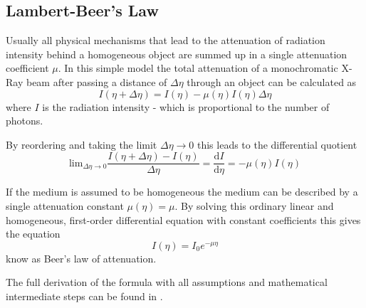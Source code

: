 \subsection{Lambert-Beer's Law\cite{buzug}}
\par Usually all physical mechanisms that lead to the attenuation of radiation intensity behind a homogeneous object are summed up in a single attenuation coefficient \(\mu\). In this simple model the total attenuation of a monochromatic X-Ray beam after passing a distance of \(\Delta\eta\) through an object can be calculated as \[I(\eta + \Delta\eta) = I(\eta) - \mu(\eta)I(\eta)\Delta\eta \] where \(I\) is the radiation intensity - which is proportional to the number of photons.
\par By reordering and taking the limit \(\Delta\eta \rightarrow 0\) this leads to the differential quotient\[\textrm{lim}_{\Delta\eta\rightarrow 0} \frac{I(\eta + \Delta\eta) - I(\eta)}{\Delta\eta} = \frac{\textrm{d}I}{\textrm{d}\eta} = -\mu(\eta)I(\eta)\]
\par If the medium is assumed to be homogeneous the medium can be described by a single attenuation constant \(\mu(\eta) = \mu\). By solving this ordinary linear and homogeneous, first-order differential equation with constant coefficients this gives the equation \[I(\eta) = I_{0}e^{-\mu\eta}\] know as Beer's law of attenuation.
\par The full derivation of the formula with all assumptions and mathematical intermediate steps can be found in \cite{buzug}.
